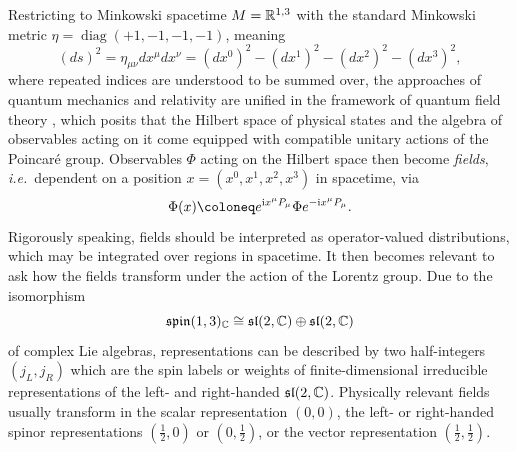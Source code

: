 Restricting to Minkowski spacetime $M=\mathbb{R}^{1,3}$ with the standard Minkowski metric $\eta = \operatorname{diag}(+1,-1,-1,-1)$, meaning
\begin{equation}
	(ds)^2 = \eta_{\mu\nu} dx^\mu dx^\nu = (dx^0)^2 - (dx^1)^2 - (dx^2)^2 - (dx^3)^2,
\end{equation}
where repeated indices are understood to be summed over, the approaches of quantum mechanics and relativity are unified in the framework of quantum field theory \cite{peskin_introduction_2018}, which posits that the Hilbert space of physical states and the algebra of observables acting on it come equipped with compatible unitary actions of the Poincaré group. Observables $\Phi$ acting on the Hilbert space then become \emph{fields}, \emph{i.e.}\ dependent on a position $x = (x^0,x^1,x^2,x^3)$ in spacetime, via
\begin{equation}
	\Phi(x) \coloneq e^{\I x^\mu P_\mu} \Phi e^{-\I x^\mu P_\mu}.
\end{equation}
Rigorously speaking, fields should be interpreted as operator-valued distributions, which may be integrated over regions in spacetime. It then becomes relevant to ask how the fields transform under the action of the Lorentz group. Due to the isomorphism
\begin{equation}
	\mathfrak{spin}(1,3)_{\mathbb{C}} \cong \mathfrak{sl}(2,\mathbb{C}) \oplus \mathfrak{sl}(2,\mathbb{C})
\end{equation}
of complex Lie algebras, representations can be described by two half-integers $(j_L,j_R)$ which are the spin labels or weights of finite-dimensional irreducible representations of the left- and right-handed $\mathfrak{sl}(2,\mathbb{C})$. Physically relevant fields usually transform in the scalar representation $(0,0)$, the left- or right-handed spinor representations $(\tfrac 12,0)$ or $(0,\tfrac 12)$, or the vector representation $(\tfrac 12, \tfrac 12)$.

